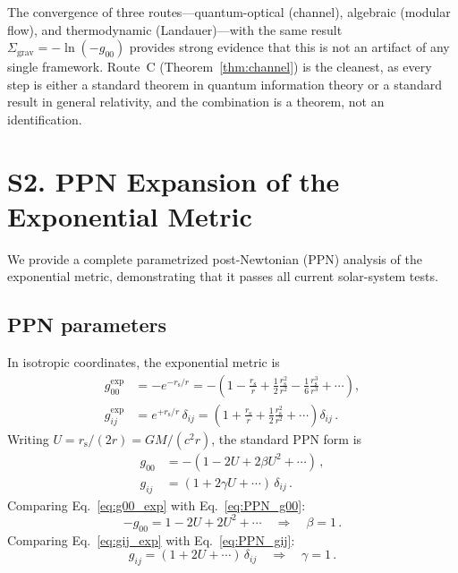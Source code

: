 \documentclass[aps,prd,preprint,superscriptaddress,longbibliography]{revtex4-2}
\newcommand{\rs}{r_{\mathrm{s}}}
\newcommand{\Sgrav}{\Sigma_{\mathrm{grav}}}
\begin{document}
The convergence of three routes---quantum-optical (channel),
algebraic (modular flow), and thermodynamic (Landauer)---with
the same result $\Sgrav = -\ln(-g_{00})$ provides strong evidence
that this is not an artifact of any single framework.  Route~C
(Theorem~\ref{thm:channel}) is the cleanest, as every step is
either a standard theorem in quantum information theory or a
standard result in general relativity, and the combination is
a theorem, not an identification.

\section{S2. PPN Expansion of the Exponential Metric}
\label{sec:PPN}

We provide a complete parametrized post-Newtonian (PPN) analysis of the
exponential metric, demonstrating that it passes all current
solar-system tests.

\subsection{PPN parameters}

In isotropic coordinates, the exponential metric is
\begin{align}
  g_{00}^{\mathrm{exp}} &= -e^{-\rs/r}
  = -\!\left(1 - \frac{\rs}{r} + \frac{1}{2}\frac{\rs^2}{r^2}
    - \frac{1}{6}\frac{\rs^3}{r^3} + \cdots\right),
  \label{eq:g00_exp}\\
  g_{ij}^{\mathrm{exp}} &= e^{+\rs/r}\,\delta_{ij}
  = \left(1 + \frac{\rs}{r} + \frac{1}{2}\frac{\rs^2}{r^2}
    + \cdots\right)\delta_{ij}\,.
  \label{eq:gij_exp}
\end{align}
Writing $U = \rs/(2r) = GM/(c^2 r)$, the standard PPN form is
\begin{align}
  g_{00} &= -(1 - 2U + 2\beta U^2 + \cdots)\,,
  \label{eq:PPN_g00}\\
  g_{ij} &= (1 + 2\gamma U + \cdots)\,\delta_{ij}\,.
  \label{eq:PPN_gij}
\end{align}
Comparing Eq.~\eqref{eq:g00_exp} with Eq.~\eqref{eq:PPN_g00}:
\begin{equation}
  -g_{00} = 1 - 2U + 2U^2 + \cdots
  \quad\Longrightarrow\quad \beta = 1\,.
  \label{eq:beta}
\end{equation}
Comparing Eq.~\eqref{eq:gij_exp} with Eq.~\eqref{eq:PPN_gij}:
\begin{equation}
  g_{ij} = (1 + 2U + \cdots)\,\delta_{ij}
  \quad\Longrightarrow\quad \gamma = 1\,.
  \label{eq:gamma}
\end{equation}
\end{document}
